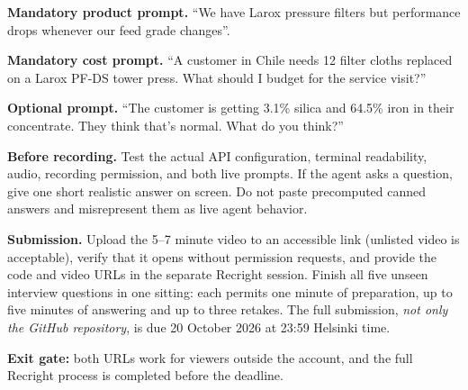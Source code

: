 \documentclass[11pt,a4paper]{article}
\begin{document}
\textbf{Mandatory product prompt.} ``We have Larox pressure filters but performance drops whenever our feed grade changes''.

\textbf{Mandatory cost prompt.} ``A customer in Chile needs 12 filter cloths replaced on a Larox PF-DS tower press. What should I budget for the service visit?''

\textbf{Optional prompt.} ``The customer is getting 3.1\% silica and 64.5\% iron in their concentrate. They think that's normal. What do you think?''

\textbf{Before recording.} Test the actual API configuration, terminal readability, audio, recording permission, and both live prompts. If the agent asks a question, give one short realistic answer on screen. Do not paste precomputed canned answers and misrepresent them as live agent behavior.

\textbf{Submission.} Upload the 5--7 minute video to an accessible link (unlisted video is acceptable), verify that it opens without permission requests, and provide the code and video URLs in the separate Recright session. Finish all five unseen interview questions in one sitting: each permits one minute of preparation, up to five minutes of answering and up to three retakes. The full submission, \emph{not only the GitHub repository}, is due 20 October 2026 at 23:59 Helsinki time.

\textbf{Exit gate:} both URLs work for viewers outside the account, and the full Recright process is completed before the deadline.
\end{document}
